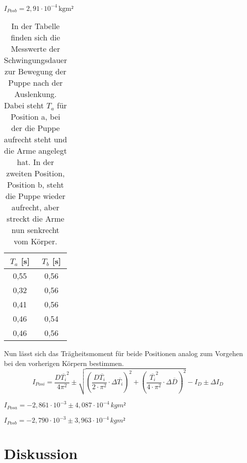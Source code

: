 \documentclass[titlepage = firstcover]{scrartcl}
\begin{document}
      $I_{Posb} = 2,91 \cdot 10^{-4} \, \text{kgm²}$
      \newpage
      \begin{table}[h]
        \centering
        \caption{In der Tabelle finden sich die Messwerte der Schwingungsdauer zur Bewegung der Puppe nach der Auslenkung. Dabei steht $T_a$ für Position a, bei der die Puppe aufrecht steht und die Arme angelegt hat. In der zweiten Position, Position b, steht die Puppe wieder aufrecht, aber streckt die Arme nun senkrecht vom Körper.}
        \label{tab:Tabelle_4}

        \begin{tabular}{c c}
          \toprule
          {$T_a$ [s]} & {$T_b$ [s]} \\
          \midrule
          0,55 & 0,56 \\
          0,32 & 0,56 \\
          0,41 & 0,56 \\ 
          0,46 & 0,54 \\
          0,46 & 0,56 \\
          \bottomrule
        \end{tabular}
      \end{table}  
      
      Nun lässt sich das Trägheitsmoment für beide Positionen analog zum Vorgehen bei den vorherigen Körpern bestimmen.
      \begin{equation*}
        I_{Posi} = \frac{D\overline{T_i}^2}{4\pi^2} \pm \sqrt{(\frac{D\overline{T_i}}{2\cdot \pi^2} \cdot \Delta \overline{T_i})^2 + (\frac{\overline{T_i}^2}{4 \cdot \pi^2} \cdot \Delta \overline{D})^2} - I_D \pm \Delta I_D
      \end{equation*}

      $I_{Posa} = -2,861 \cdot 10^{-3} \pm 4,087 \cdot 10^{-4} \, kgm²$ \newline

      $I_{Posb} = -2,790 \cdot 10^{-3} \pm 3,963 \cdot 10^{-4} \, kgm²$
        
      

    \section{Diskussion}
    
\end{document}
